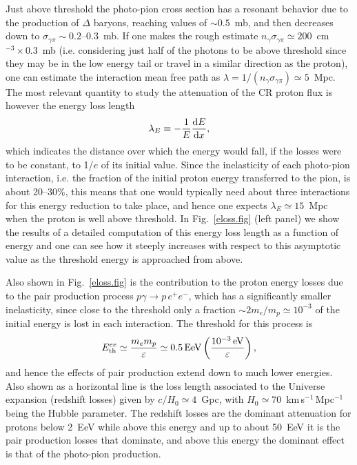 \documentclass[twoside,12pt]{article}
\newcommand{\be}{\begin{equation}}
\newcommand{\ee}{\end{equation}}
\begin{document}
Just above threshold the photo-pion cross section has a resonant behavior due to the production of $\Delta$ baryons, reaching values of $\sim 0.5$~mb, and then decreases down to $\sigma_{\gamma \pi}\sim 0.2$--0.3~mb. If one makes the rough estimate $n_\gamma \sigma_{\gamma \pi}\simeq 200$~cm$^{-3}\times  0.3$~mb (i.e. considering just half of the photons to be above threshold since they may be in the low energy tail or travel in a similar direction as the proton), one can estimate the interaction  mean free path as $\lambda=1/(n_\gamma\sigma_{\gamma\pi})\simeq 5$~Mpc. The most relevant quantity to study the attenuation of the CR proton flux is however the energy loss length 
\be 
\lambda_E\equiv -\frac{1}{E}\frac{{\rm d}E}{{\rm d}x},
\ee
which indicates the distance over which the energy would fall, if the losses were to be constant, to 1/$e$ of its initial value. Since the inelasticity of each photo-pion interaction, i.e. the fraction of the initial proton energy transferred to the pion, is about 20--30\%, this means that one would typically need about three interactions for this energy reduction to take place, and hence one expects $\lambda_E\simeq 15$~Mpc  when the proton is well above threshold. In Fig.~\ref{eloss.fig} (left panel) we show the results of a detailed computation of this energy loss length as a function of energy and one can see how it steeply increases with respect to this asymptotic value as the threshold energy is approached from above. 

Also shown in Fig.~\ref{eloss.fig} is the contribution to the proton energy losses due to the pair production process $p\gamma\to p\,e^{+}e^{-}$, which has a significantly smaller inelasticity, since close to the threshold only a fraction $\sim 2m_e/m_p\simeq 10^{-3}$ of the initial energy is lost in each interaction. The threshold for this process is
\be 
E^{ee}_{\rm th}\simeq \frac{m_e m_p}{\varepsilon}\simeq 0.5\,{\rm EeV}\left(\frac{10^{-3}\,{\rm eV}}{\varepsilon}\right),
\ee
and hence the effects of pair production extend down to much lower energies.
Also shown as a horizontal line is the loss length associated to the Universe expansion (redshift losses) given by $c/H_0\simeq 4$~Gpc, with $H_0\simeq 70$~km\,s$^{-1}$\,Mpc$^{-1}$ being the Hubble parameter. The redshift losses are the dominant attenuation for protons below 2~EeV while above this energy and up to about 50~EeV it is the pair production losses that dominate, and above this energy the dominant effect is that of the photo-pion production. 
\end{document}
